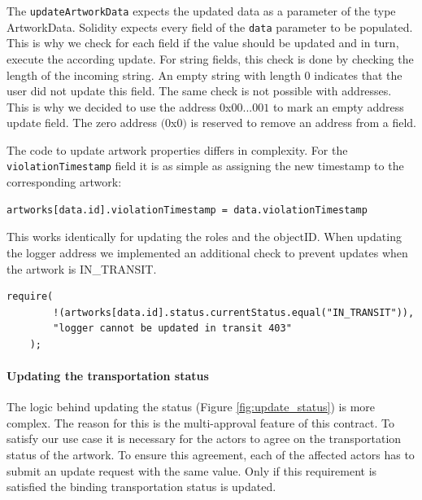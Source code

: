 

The \texttt{updateArtworkData} expects the updated data as a parameter of the type ArtworkData. Solidity expects every field of the \texttt{data} parameter to be populated. This is why we check for each field if the value should be updated and in turn, execute the according update. For string fields, this check is done by checking the length of the incoming string. An empty string with length $0$ indicates that the user did not update this field. The same check is not possible with addresses. This is why we decided to use the address $0$x$00...001$ to mark an empty address update field. The zero address $(0$x$0)$ is reserved to remove an address from a field.

The code to update artwork properties differs in complexity. For the \texttt{violationTimestamp} field it is as simple as assigning the new timestamp to the corresponding artwork: 
\begin{lstlisting}[language=Solidity]
    artworks[data.id].violationTimestamp = data.violationTimestamp
\end{lstlisting}
This works identically for updating the roles and the objectID. When updating the logger address we implemented an additional check to prevent updates when the artwork is IN\_TRANSIT.
\begin{lstlisting}[language=Solidity]
    require(
        !(artworks[data.id].status.currentStatus.equal("IN_TRANSIT")),
        "logger cannot be updated in transit 403"
    );
\end{lstlisting}

\paragraph{Updating the transportation status}
\label{sec:update_status}
The logic behind updating the status (Figure \ref{fig:update_status}) is more complex. The reason for this is the multi-approval feature of this contract. To satisfy our use case it is necessary for the actors to agree on the transportation status of the artwork. To ensure this agreement, each of the affected actors has to submit an update request with the same value. Only if this requirement is satisfied the binding transportation status is updated. 

